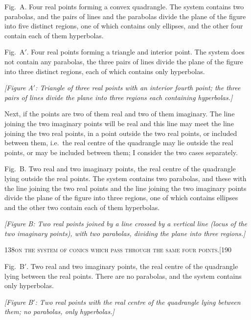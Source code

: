 \documentclass[11pt]{article}
\begin{document}
\noindent Fig.\ A. Four real points forming a convex quadrangle. The system contains two
parabolas, and the pairs of lines and the parabolas divide the plane of the figure into
five distinct regions, one of which contains only ellipses, and the other four contain
each of them hyperbolas.

Fig.\ A$'$. Four real points forming a triangle and interior point. The system does
not contain any parabolas, the three pairs of lines divide the plane of the figure into
three distinct regions, each of which contains only hyperbolas.

\medskip
\textit{[Figure A$'$: Triangle of three real points with an interior fourth point; the three pairs of lines divide the plane into three regions each containing hyperbolas.]}

\medskip
Next, if the points are two of them real and two of them imaginary. The line
joining the two imaginary points will be real and this line may meet the line joining
the two real points, in a point outside the two real points, or included between them,
i.e.\ the real centre of the quadrangle may lie outside the real points, or may be
included between them; I consider the two cases separately.

Fig.\ B. Two real and two imaginary points, the real centre of the quadrangle
lying outside the real points. The system contains two parabolas, and these with the
line joining the two real points and the line joining the two imaginary points divide
the plane of the figure into three regions, one of which contains ellipses and the
other two contain each of them hyperbolas.

\medskip
\textit{[Figure B: Two real points joined by a line crossed by a vertical line (locus of the two imaginary points), with two parabolas, dividing the plane into three regions.]}

\begin{center}\small\textsc{138}\hfill\textsc{on the system of conics which pass through the same four points.}\hfill[190\end{center}

\noindent Fig.\ B$'$. Two real and two imaginary points, the real centre of the quadrangle
lying between the real points. There are no parabolas, and the system contains only
hyperbolas.

\medskip
\textit{[Figure B$'$: Two real points with the real centre of the quadrangle lying between them; no parabolas, only hyperbolas.]}
\end{document}

